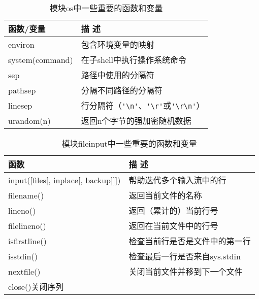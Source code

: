 \begin{table}
    \centering
    \caption{模块os中一些重要的函数和变量}
    \label{os}
    \begin{tabular}{ll}
        \hline
        函数/变量           & 描 述                                         \\
        \hline
        environ         & 包含环境变量的映射                                   \\
        system(command) & 在子shell中执行操作系统命令                            \\
        sep             & 路径中使用的分隔符                                   \\
        pathsep         & 分隔不同路径的分隔符                                  \\
        linesep         & 行分隔符（\verb|'\n'|、\verb|'\r'|或\verb|'\r\n'|） \\
        urandom(n)      & 返回n个字节的强加密随机数据                              \\
        \hline
    \end{tabular}
\end{table}

\begin{table}
    \centering
    \caption{模块fileinput中一些重要的函数和变量}
    \label{fileinput}
    \begin{tabular}{ll}
        \hline
        函数                                  & 描 述                 \\
        \hline
        input([files[, inplace[, backup]]]) & 帮助迭代多个输入流中的行        \\
        filename()                          & 返回当前文件的名称           \\
        lineno()                            & 返回（累计的）当前行号         \\
        filelineno()                        & 返回在当前文件中的行号         \\
        isfirstline()                       & 检查当前行是否是文件中的第一行     \\
        isstdin()                           & 检查最后一行是否来自sys.stdin \\
        nextfile()                          & 关闭当前文件并移到下一个文件      \\
        close()关闭序列                                               \\
        \hline
    \end{tabular}
\end{table}

